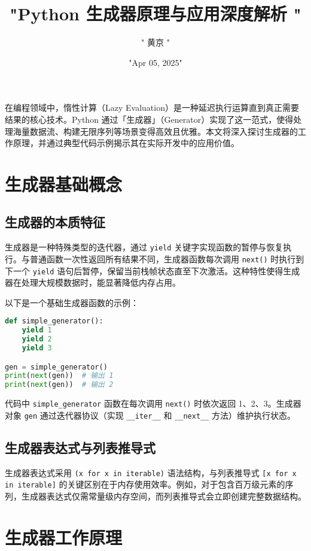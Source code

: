 \title{"Python 生成器原理与应用深度解析 "}
\author{" 黄京 "}
\date{"Apr 05, 2025"}
\maketitle
在编程领域中，惰性计算（Lazy Evaluation）是一种延迟执行运算直到真正需要结果的核心技术。Python 通过「生成器」（Generator）实现了这一范式，使得处理海量数据流、构建无限序列等场景变得高效且优雅。本文将深入探讨生成器的工作原理，并通过典型代码示例揭示其在实际开发中的应用价值。\par
\chapter{生成器基础概念}
\section{生成器的本质特征}
生成器是一种特殊类型的迭代器，通过 \verb!yield! 关键字实现函数的暂停与恢复执行。与普通函数一次性返回所有结果不同，生成器函数每次调用 \verb!next()! 时执行到下一个 \verb!yield! 语句后暂停，保留当前栈帧状态直至下次激活。这种特性使得生成器在处理大规模数据时，能显著降低内存占用。\par
以下是一个基础生成器函数的示例：\par
\begin{lstlisting}[language=python]
def simple_generator():
    yield 1
    yield 2
    yield 3

gen = simple_generator()
print(next(gen))  # 输出 1
print(next(gen))  # 输出 2
\end{lstlisting}
代码中 \verb!simple_generator! 函数在每次调用 \verb!next()! 时依次返回 1、2、3。生成器对象 \verb!gen! 通过迭代器协议（实现 \verb!__iter__! 和 \verb!__next__! 方法）维护执行状态。\par
\section{生成器表达式与列表推导式}
生成器表达式采用 \verb!(x for x in iterable)! 语法结构，与列表推导式 \verb![x for x in iterable]! 的关键区别在于内存使用效率。例如，对于包含百万级元素的序列，生成器表达式仅需常量级内存空间，而列表推导式会立即创建完整数据结构。\par
\chapter{生成器工作原理}
